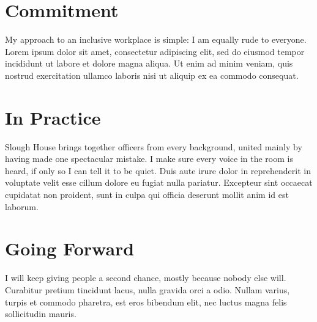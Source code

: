 \documentclass[11pt]{article}
\newcommand{\diversitytitle}{\ifempty{\diversitydocname}{Diversity Statement}{\draftcolor{\diversitydocname}}}
\begin{document}
\makeletterhead
\doctitle{\diversitytitle}
\preparedfor


\section{Commitment}
My approach to an inclusive workplace is simple: I am equally rude to everyone. Lorem ipsum dolor sit amet, consectetur adipiscing elit, sed do eiusmod tempor incididunt ut labore et dolore magna aliqua. Ut enim ad minim veniam, quis nostrud exercitation ullamco laboris nisi ut aliquip ex ea commodo consequat.

\section{In Practice}
Slough House brings together officers from every background, united mainly by having made one spectacular mistake. I make sure every voice in the room is heard, if only so I can tell it to be quiet. Duis aute irure dolor in reprehenderit in voluptate velit esse cillum dolore eu fugiat nulla pariatur. Excepteur sint occaecat cupidatat non proident, sunt in culpa qui officia deserunt mollit anim id est laborum.

\section{Going Forward}
I will keep giving people a second chance, mostly because nobody else will. Curabitur pretium tincidunt lacus, nulla gravida orci a odio. Nullam varius, turpis et commodo pharetra, est eros bibendum elit, nec luctus magna felis sollicitudin mauris.
\end{document}
